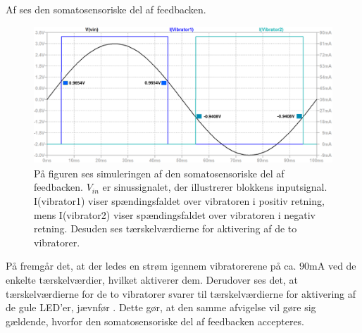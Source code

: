 \noindent Af  ses den somatosensoriske del af feedbacken.
\begin{figure}[H]
	\centering
	\includegraphics[scale=0.36]{figures/cProblemloesning/vibration_graf.PNG}
	\caption{På figuren ses simuleringen af den somatosensoriske del af feedbacken. $V_{in}$ er sinussignalet, der illustrerer blokkens inputsignal. I(vibrator1) viser spændingsfaldet over vibratoren i positiv retning, mens I(vibrator2) viser spændingsfaldet over vibratoren i negativ retning. Desuden ses tærskelværdierne for aktivering af de to vibratorer.}
	\label{fig:vibration_graf}
\end{figure}
\noindent På  fremgår det, at der ledes en strøm igennem vibratorerene på ca. $90$mA ved de enkelte tærskelværdier, hvilket aktiverer dem. Derudover ses det, at tærskelværdierne for de to vibratorer svarer til tærskelværdierne for aktivering af de gule LED'er, jævnfør . Dette gør, at den samme afvigelse vil gøre sig gældende, hvorfor den somatosensoriske del af feedbacken accepteres. 

